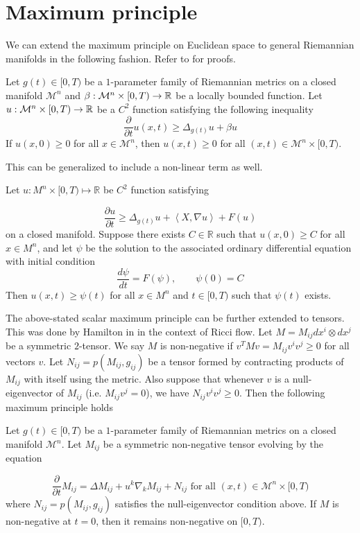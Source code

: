 \section{Maximum principle}\label{max}
We can extend the maximum principle on Euclidean space to general Riemannian manifolds in the following fashion. Refer to \cite{chow2004ricci} for proofs.
\begin{lemma}
    Let $ g(t) \in [0,T) $ be a $ 1 $-parameter family of Riemannian metrics on a closed manifold $ \mathcal{M}^{n} $ and $ \beta : \mathcal{M}^{n} \times [0,T) \to \mathbb{R} $ be a locally bounded function. Let $ u : \mathcal{M}^{n} \times [0,T) \to \mathbb{R}$ be a $ C^{2} $ function satisfying the following inequality 
    \[ \frac{ \partial}{ \partial t}u(x,t) \ge \Delta_{g(t)}u + \beta u\]
    If $ u(x,0) \ge 0 $ for all $ x \in \mathcal{M}^{n}$, then $ u(x,t) \ge 0 $ for all $ (x,t) \in \mathcal{M}^{n} \times [0,T) $.
\end{lemma}

This can be generalized to include a non-linear term as well. \begin{lemma}
 Let $u: M^n \times[0, T) \mapsto \mathbb{R}$ be $C^2$ function satisfying
 
 \[ \frac{\partial u}{\partial t} \ge \Delta_{g(t)}u + \left< X, \nabla u \right> + F(u)\]
  on a closed manifold. Suppose there exists $C \in \mathbb{R}$ such that $u(x, 0) \geq C$ for all $x \in M^n$, and let $\psi$ be the solution to the associated ordinary differential equation with initial condition
  \[ \frac{d \psi}{d t}=F(\psi), \qquad \psi(0)=C \]
Then $u(x,t) \geq \psi(t)$ for all $x \in M^n$ and $t \in[0, T)$ such that $\psi(t)$ exists.
\end{lemma}

The above-stated scalar maximum principle can be further extended to tensors. This was done by Hamilton in \cite{hamilton1982three} in the context of Ricci flow. Let $ M = M_{ij}dx^{i}\otimes dx^{j} $ be a symmetric $ 2 $-tensor. We say $ M $ is non-negative if $ v^{T}Mv = M_{ij}v^{i}v^{j} \ge 0 $ for all vectors $ v $. Let $ N_{ij} = p(M_{ij},g_{ij}) $ be a tensor formed by contracting products of $ M_{ij} $ with itself using the metric. Also suppose that whenever $ v $ is a null-eigenvector of $ M_{ij} $ (i.e. $ M_{ij}v^{j} = 0 $), we have $ N_{ij}v^{i}v^{j} \ge 0 $. Then the following maximum principle holds

\begin{lemma}
	Let $ g(t) \in [0,T)  $ be a $ 1 $-parameter family of Riemannian metrics on a closed manifold $ \mathcal{M}^{n} $. Let $ M_{ij} $ be a symmetric non-negative tensor evolving by the equation 
	
        \[ \frac{ \partial}{ \partial t}M_{ij} = \Delta M_{ij} + u^{k}\nabla_{k}M_{ij}+ N_{ij}  \text{ for all } (x,t) \in  \mathcal{M}^{n} \times [0,T) \]
	where $ N_{ij} = p(M_{ij},g_{ij}) $ satisfies the null-eigenvector condition above. If $ M $ is non-negative at $ t=0 $, then it remains non-negative on $ [0,T) $.
\end{lemma}

